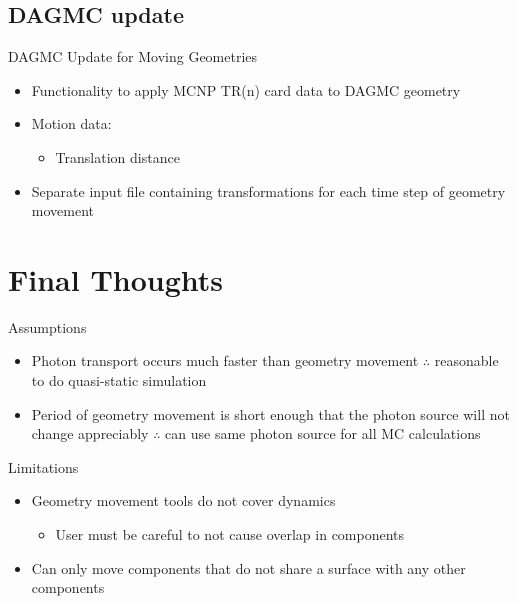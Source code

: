 \documentclass{beamer}
\begin{document}
\subsection{DAGMC update}
\begin{frame}{DAGMC Update for Moving Geometries}
	\begin{itemize}
		\item{Functionality to apply MCNP TR(n) card data to DAGMC
			geometry}
		\item{Motion data:}
			\begin{itemize}
				\item{Translation distance}
			\end{itemize}
		\item{Separate input file containing transformations for each
			time step of geometry movement}
	\end{itemize}
\end{frame}


\section{Final Thoughts}
\begin{frame}{Assumptions}
			\begin{itemize}
				\item{Photon transport occurs much faster than
					geometry movement $\therefore$
					reasonable to do quasi-static
					simulation}
				\item{Period of geometry movement is short
					enough that the photon source will not
					change appreciably $\therefore$ can use
					same photon source for all MC
					calculations}
			\end{itemize}
	\end{frame}
\begin{frame}{Limitations}
\begin{itemize}
\item{Geometry movement tools do not cover dynamics}
   \begin{itemize}
   \item{User must be careful to not cause overlap in components}
   \end{itemize}
\item{Can only move components that do not share a surface with any other components}
\end{itemize}
\end{frame}
\end{document}
